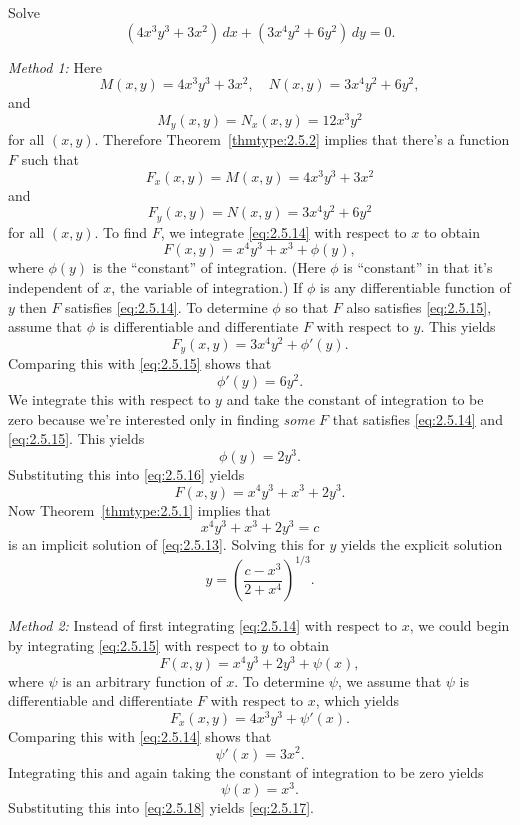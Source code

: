 \documentclass{ximera}
\begin{document}
\begin{example}\label{example:2.5.3}
Solve
\begin{equation} \label{eq:2.5.13}
(4x^3y^3+3x^2)\,dx+(3x^4y^2+6y^2)\,dy=0.
\end{equation}

\begin{explanation}
\textit{Method 1:}
Here
$$
M(x,y)=4x^3y^3+3x^2,\quad N(x,y)=3x^4y^2+6y^2,
$$
and
$$
M_y(x,y)=N_x(x,y)=12 x^3y^2
$$
for all $(x,y)$.
Therefore
Theorem~\ref{thmtype:2.5.2} implies that there's a function $F$ such that
\begin{equation} \label{eq:2.5.14}
F_x(x,y)=M(x,y)=4x^3y^3+3x^2
\end{equation}
 and
\begin{equation} \label{eq:2.5.15}
F_y(x,y)=N(x,y)=3x^4y^2+6y^2
\end{equation}
 for all $(x,y)$.  To find $F$, we integrate \eqref{eq:2.5.14} with
respect to $x$ to obtain
\begin{equation} \label{eq:2.5.16}
F(x,y)=x^4y^3+x^3+\phi(y),
\end{equation}
 where $\phi (y)$ is the ``constant'' of integration.  (Here
$\phi$ is ``constant'' in  that it's independent of $x$, the
variable of integration.)  If $\phi$ is any differentiable function of
$y$ then $F$  satisfies \eqref{eq:2.5.14}.  To
determine $\phi$ so that
$F$ also satisfies \eqref{eq:2.5.15}, assume that $\phi$ is
differentiable and differentiate $F$ with respect to $y$.
This yields
$$
F_y(x,y)=3x^4y^2+\phi'(y).
$$
 Comparing this with \eqref{eq:2.5.15} shows that
$$
\phi'(y)=6y^2.
$$
 We integrate this with respect to $y$ and take the
constant of integration to be zero because we're interested only in
finding \textit{some} $F$ that satisfies \eqref{eq:2.5.14} and
\eqref{eq:2.5.15}. This  yields
$$
\phi (y)=2y^3.
$$
Substituting this into \eqref{eq:2.5.16} yields
\begin{equation} \label{eq:2.5.17}
F(x,y)=x^4y^3+x^3+2y^3.
\end{equation}
Now Theorem~\ref{thmtype:2.5.1} implies that
$$
x^4y^3+x^3+2y^3=c
$$
is an implicit solution of \eqref{eq:2.5.13}. Solving this for $y$
yields the explicit solution
$$
y=\left(\frac{c-x^3}{2+x^4}\right)^{1/3}.
$$

\textit{Method 2:} Instead of first integrating
\eqref{eq:2.5.14}
with respect to $x$, we could begin by integrating \eqref{eq:2.5.15} with
respect to $y$ to obtain
\begin{equation} \label{eq:2.5.18}
F(x,y)=x^4y^3+2y^3+\psi (x),
\end{equation}
 where $\psi$ is an arbitrary  function of
$x$.  To determine $\psi$, we assume that $\psi$ is
differentiable and differentiate $F$ with respect to $x$,
which yields
$$
F_x(x,y)=4x^3y^3+\psi'(x).
$$
 Comparing this with \eqref{eq:2.5.14} shows that
$$
\psi'(x)=3x^2.
$$
Integrating this and again taking  the constant of
integration to be zero yields
$$
\psi(x)=x^3.
$$
 Substituting this into \eqref{eq:2.5.18} yields \eqref{eq:2.5.17}.


\end{explanation}
\end{example}
\end{document}
